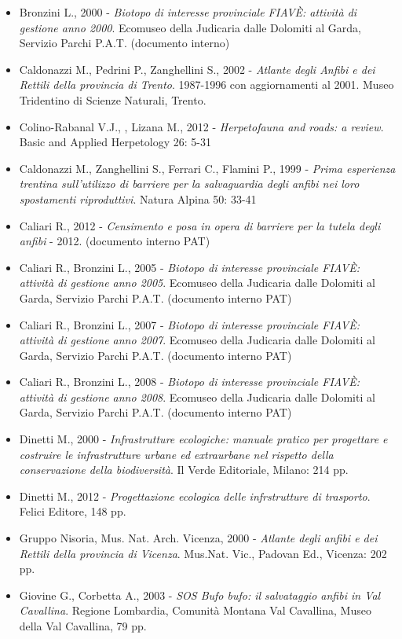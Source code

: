 \documentclass[11pt,a4paper,twoside]{memoir}
\begin{document}
\begin{itemize}
\item Bronzini L., 2000 - \emph{Biotopo di interesse provinciale FIAVÈ: attività di gestione anno 2000}. Ecomuseo della Judicaria dalle Dolomiti al Garda, Servizio Parchi P.A.T. (documento interno)
\item Caldonazzi M., Pedrini P., Zanghellini S., 2002 - \emph{Atlante degli Anfibi e dei Rettili della provincia di Trento}. 1987-1996 con aggiornamenti al 2001. Museo Tridentino di Scienze Naturali, Trento.
\item Colino-Rabanal V.J., , Lizana M., 2012 -\emph{ Herpetofauna and roads: a review}. Basic and Applied Herpetology 26: 5-31
\item Caldonazzi M., Zanghellini S., Ferrari C., Flamini P., 1999 - \emph{Prima esperienza trentina sull'utilizzo di barriere per la salvaguardia degli anfibi nei loro spostamenti riproduttivi}. Natura Alpina 50: 33-41
\item Caliari R., 2012 - \emph{Censimento e posa in opera di barriere per la tutela degli anfibi} - 2012. (documento interno PAT)
\item Caliari R., Bronzini L., 2005 - \emph{Biotopo di interesse provinciale FIAVÈ: attività di gestione anno 2005}. Ecomuseo della Judicaria dalle Dolomiti al Garda, Servizio Parchi P.A.T. (documento interno PAT)
\item Caliari R., Bronzini L., 2007 - \emph{Biotopo di interesse provinciale FIAVÈ: attività di gestione anno 2007}. Ecomuseo della Judicaria dalle Dolomiti al Garda, Servizio Parchi P.A.T. (documento interno PAT)
\item Caliari R., Bronzini L., 2008 - \emph{Biotopo di interesse provinciale FIAVÈ: attività di gestione anno 2008}. Ecomuseo della Judicaria dalle Dolomiti al Garda, Servizio Parchi P.A.T. (documento interno PAT)
\item Dinetti M., 2000 - \emph{Infrastrutture ecologiche: manuale pratico per progettare e costruire le infrastrutture urbane ed extraurbane nel rispetto della conservazione della biodiversità}. Il Verde Editoriale, Milano: 214 pp.
\item Dinetti M., 2012 - \emph{Progettazione ecologica delle infrstrutture di trasporto}. Felici Editore, 148 pp.
\item Gruppo Nisoria, Mus. Nat. Arch. Vicenza, 2000 - \emph{Atlante degli anfibi e dei Rettili della provincia di Vicenza}. Mus.Nat. Vic., Padovan Ed., Vicenza: 202 pp.
\item Giovine G., Corbetta A., 2003 - \emph{SOS \emph{Bufo bufo}: il salvataggio anfibi in Val Cavallina}. Regione Lombardia, Comunità Montana Val Cavallina, Museo della Val Cavallina, 79 pp.

\end{itemize}
\end{document}
